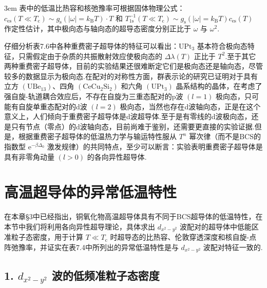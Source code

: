 {\emergencystretch 3em
表中的低温比热容和核弛豫率可根据固体物理公式：$c_{\mathrm{es}}\left(T\ll T_{\mathrm{c}}\right)\sim\allowbreak g_{\mathrm{s}}\left(\left|\omega\right|=k_{\mathrm{B}}T\right)\cdot T$ 和 $T_{1\mathrm{s}}^{-1}\left(T\ll T_{\mathrm{c}}\right)\sim\allowbreak g_{\mathrm{s}}\left(\left|\omega\right|=k_{\mathrm{B}}T\right)c_{\mathrm{es}}\left(T\right)$ 作定性估计，其中极向态与轴向态的超导态密度分别正比于 $\omega$ 与 $\omega^{2}$.\par}

仔细分析表7.6中各种重费密子超导体的特征可以看出：$\mathrm{UPt}_{3}$ 基本符合极向态特征，只需假定由于杂质的共振散射效应使极向态的 $\Delta\lambda\left(T\right)$ 正比于 $T^{2}$.至于其它两种重费密子超导体，目前的实验结果还很难断定它们是极向态还是轴向态，尽管较多的数据显示为极向态.在配对的对称性方面，群表示论的研究已证明对于具有立方 $\left(\mathrm{UBe}_{13}\right)$、四角 $\left(\mathrm{CeCu}_{2}\mathrm{Si}_{2}\right)$ 和六角 $\left(\mathrm{UPt}_{3}\right)$ 晶系结构的晶体，在考虑了强自旋-轨道耦合效应后，不存在自旋为三重态配对的p波 $\left(l=1\right)$ 极向态，只可能有自旋单重态配对的d波 $\left(l=2\right)$ 极向态，当然也存在d波轴向态，正是在这个意义上，人们倾向于重费密子超导体是d波超导体.至于是有零线的d波极向态，还是只有节点（零点）的d波轴向态，目前尚难于鉴别，还需要更直接的实验证据.但是，根据重费密子超导体的低温热力学与输运特性服从 $T^{n}$ 幂次律（而不是BCS的指数型 $\mathrm{e}^{-\beta\Delta_{0}}$ 激发规律）的共同特点，至少可以断言：实验表明重费密子超导体是具有非零角动量 $\left(l>0\right)$ 的各向异性超导体.

\section{高温超导体的异常低温特性}

在本章§3中已经指出，铜氧化物高温超导体具有不同于BCS超导体的低温特性，在本节中我们将利用各向异性超导理论，具体求出 $d_{x^{2}-y^{2}}$ 波配对的超导体中低能区准粒子态密度，用于计算 $T\ll T_{\mathrm{c}}$ 时超导态的比热容、伦敦穿透深度和核自旋-点阵弛豫率，并证实在表7.4中所列出的异常低温特性是与 $d_{x^{2}-y^{2}}$ 波配对特征一致的.

\subsection*{1. $d_{x^{2}-y^{2}}$ 波的低频准粒子态密度}

